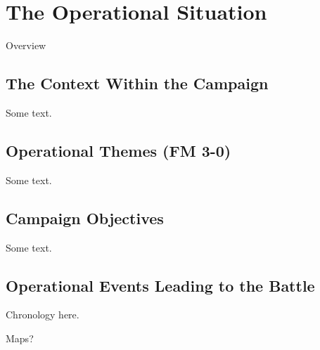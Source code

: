 \section{The Operational Situation}

Overview

\subsection{The Context Within the Campaign}

Some text.

\subsection{Operational Themes (FM 3-0)}

Some text.

\subsection{Campaign Objectives}

Some text.

\subsection{Operational Events Leading to the Battle}

Chronology here.

Maps?

